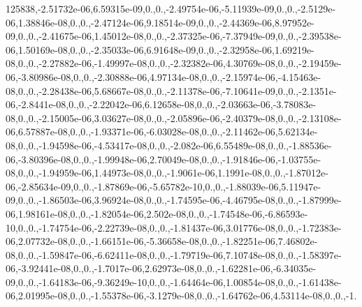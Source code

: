 \begin{DoxyCompactItemize}
125838,-\/2.\-51732e-\/06,6.\-59315e-\/09,0.,0.,-\/2.\-49754e-\/06,-\/5.\-11939e-\/09,0.,0.,-\/2.\-5129e-\/06,1.\-38846e-\/08,0.,0.,-\/2.\-47124e-\/06,9.\-18514e-\/09,0.,0.,-\/2.\-44369e-\/06,8.\-97952e-\/09,0.,0.,-\/2.\-41675e-\/06,1.\-45012e-\/08,0.,0.,-\/2.\-37325e-\/06,-\/7.\-37949e-\/09,0.,0.,-\/2.\-39538e-\/06,1.\-50169e-\/08,0.,0.,-\/2.\-35033e-\/06,6.\-91648e-\/09,0.,0.,-\/2.\-32958e-\/06,1.\-69219e-\/08,0.,0.,-\/2.\-27882e-\/06,-\/1.\-49997e-\/08,0.,0.,-\/2.\-32382e-\/06,4.\-30769e-\/08,0.,0.,-\/2.\-19459e-\/06,-\/3.\-80986e-\/08,0.,0.,-\/2.\-30888e-\/06,4.\-97134e-\/08,0.,0.,-\/2.\-15974e-\/06,-\/4.\-15463e-\/08,0.,0.,-\/2.\-28438e-\/06,5.\-68667e-\/08,0.,0.,-\/2.\-11378e-\/06,-\/7.\-10641e-\/09,0.,0.,-\/2.\-1351e-\/06,-\/2.\-8441e-\/08,0.,0.,-\/2.\-22042e-\/06,6.\-12658e-\/08,0.,0.,-\/2.\-03663e-\/06,-\/3.\-78083e-\/08,0.,0.,-\/2.\-15005e-\/06,3.\-03627e-\/08,0.,0.,-\/2.\-05896e-\/06,-\/2.\-40379e-\/08,0.,0.,-\/2.\-13108e-\/06,6.\-57887e-\/08,0.,0.,-\/1.\-93371e-\/06,-\/6.\-03028e-\/08,0.,0.,-\/2.\-11462e-\/06,5.\-62134e-\/08,0.,0.,-\/1.\-94598e-\/06,-\/4.\-53417e-\/08,0.,0.,-\/2.\-082e-\/06,6.\-55489e-\/08,0.,0.,-\/1.\-88536e-\/06,-\/3.\-80396e-\/08,0.,0.,-\/1.\-99948e-\/06,2.\-70049e-\/08,0.,0.,-\/1.\-91846e-\/06,-\/1.\-03755e-\/08,0.,0.,-\/1.\-94959e-\/06,1.\-44973e-\/08,0.,0.,-\/1.\-9061e-\/06,1.\-1991e-\/08,0.,0.,-\/1.\-87012e-\/06,-\/2.\-85634e-\/09,0.,0.,-\/1.\-87869e-\/06,-\/5.\-65782e-\/10,0.,0.,-\/1.\-88039e-\/06,5.\-11947e-\/09,0.,0.,-\/1.\-86503e-\/06,3.\-96924e-\/08,0.,0.,-\/1.\-74595e-\/06,-\/4.\-46795e-\/08,0.,0.,-\/1.\-87999e-\/06,1.\-98161e-\/08,0.,0.,-\/1.\-82054e-\/06,2.\-502e-\/08,0.,0.,-\/1.\-74548e-\/06,-\/6.\-86593e-\/10,0.,0.,-\/1.\-74754e-\/06,-\/2.\-22739e-\/08,0.,0.,-\/1.\-81437e-\/06,3.\-01776e-\/08,0.,0.,-\/1.\-72383e-\/06,2.\-07732e-\/08,0.,0.,-\/1.\-66151e-\/06,-\/5.\-36658e-\/08,0.,0.,-\/1.\-82251e-\/06,7.\-46802e-\/08,0.,0.,-\/1.\-59847e-\/06,-\/6.\-62411e-\/08,0.,0.,-\/1.\-79719e-\/06,7.\-10748e-\/08,0.,0.,-\/1.\-58397e-\/06,-\/3.\-92441e-\/08,0.,0.,-\/1.\-7017e-\/06,2.\-62973e-\/08,0.,0.,-\/1.\-62281e-\/06,-\/6.\-34035e-\/09,0.,0.,-\/1.\-64183e-\/06,-\/9.\-36249e-\/10,0.,0.,-\/1.\-64464e-\/06,1.\-00854e-\/08,0.,0.,-\/1.\-61438e-\/06,2.\-01995e-\/08,0.,0.,-\/1.\-55378e-\/06,-\/3.\-1279e-\/08,0.,0.,-\/1.\-64762e-\/06,4.\-53114e-\/08,0.,0.,-\/1.
\end{DoxyCompactItemize}
